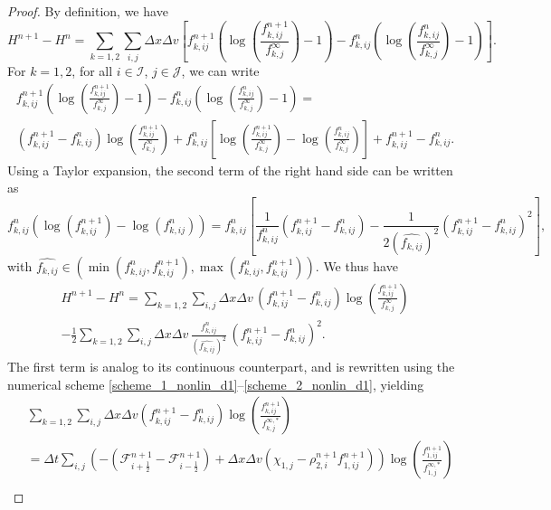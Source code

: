 \documentclass[reqno]{amsart}
\newcommand{\Dt}{\Delta t}
\newcommand{\Dx}{\Delta x}
\newcommand{\Dv}{\Delta v}
\newcommand{\II}{\mathcal{I}}
\newcommand{\J}{\mathcal{J}}
\newcommand{\iph}{{i+\frac{1}{2}}}
\newcommand{\imh}{{i-\frac{1}{2}}}
\numberwithin{equation}{section}
\begin{document}
\begin{proof}
    By definition, we have
    \begin{equation*}
        H^{n+1}-H^n=\sum_{k=1,2}\sum_{i,j}\Dx \Dv \left[f_{k,ij}^{n+1}\left(\log\left(\frac{f_{k,ij}^{n+1}}{f_{k,j}^\infty}\right)-1\right)-f_{k,ij}^{n}\left(\log\left(\frac{f_{k,ij}^{n}}{f_{k,j}^\infty}\right)-1\right)\right].
    \end{equation*}
    For $k=1,2$, for all $i\in\II$, $j\in\J$, we can write
    \begin{gather*}
        f_{k,ij}^{n+1}\left(\log\left(\frac{f_{k,ij}^{n+1}}{f_{k,j}^\infty}\right)-1\right)-f_{k,ij}^{n}\left(\log\left(\frac{f_{k,ij}^{n}}{f_{k,j}^\infty}\right)-1\right) = \\
        (f_{k,ij}^{n+1}-f_{k,ij}^n)\log\left(\frac{f_{k,ij}^{n+1}}{f_{k,j}^\infty}\right)+f_{k,ij}^n\left[\log\left(\frac{f_{k,ij}^{n+1}}{f_{k,j}^\infty}\right)-\log\left(\frac{f_{k,ij}^n}{f_{k,j}^\infty}\right)\right]+f_{k,ij}^{n+1}-f_{k,ij}^n.
    \end{gather*}
    Using a Taylor expansion, the second term of the right hand side can be written as
    \[ 
        f_{k,ij}^n\left(\log(f_{k,ij}^{n+1})-\log(f_{k,ij}^n)\right) = f_{k,ij}^n\left[\frac{1}{f_{k,ij}^n}(f_{k,ij}^{n+1}-f_{k,ij}^n)-\frac{1}{2(\widehat{f_{k,ij}})^2}(f_{k,ij}^{n+1}-f_{k,ij}^n)^2\right],
    \]
    with $\widehat{f_{k,ij}}\in\left (\min(f_{k,ij}^n,f_{k,ij}^{n+1}),\max(f_{k,ij}^n,f_{k,ij}^{n+1})\right)$.
    We thus have
    \begin{gather}
        H^{n+1}-H^n=\sum_{k=1,2}\sum_{i,j}\Dx \Dv\, (f_{k,ij}^{n+1}-f_{k,ij}^n)\log\left(\frac{f_{k,ij}^{n+1}}{f_{k,j}^\infty}\right) \nonumber\\
        -\frac{1}{2}\sum_{k=1,2}\sum_{i,j}\Dx \Dv \,\frac{f_{k,ij}^n}{(\widehat{f_{k,ij}})^2}\,(f_{k,ij}^{n+1}-f_{k,ij}^n)^2.\label{micro_d1}
    \end{gather}
    The first term is analog to its continuous counterpart, and is rewritten using the numerical scheme \eqref{scheme_1_nonlin_d1}--\eqref{scheme_2_nonlin_d1}, yielding
    \begin{align}
        &\sum_{k=1,2}\sum_{i,j}\Dx\Dv(f_{k,ij}^{n+1}-f_{k,ij}^n)\log\left(\frac{f^{n+1}_{k,ij}}{f_{k,j}^{\infty,*}}\right)\label{micro_d2}\\
        &=\Dt\sum_{i,j}\left(-(\mathcal{F}^{n+1}_{\iph}-\mathcal{F}^{n+1}_{\imh})+\Dx\Dv(\chi_{1,j}-\rho^{n+1}_{2,i}f^{n+1}_{1,ij})\right)\log\left(\frac{f^{n+1}_{1,ij}}{f_{1,j}^{\infty,*}}\right)\nonumber\\

\end{align}
\end{proof}
\end{document}
